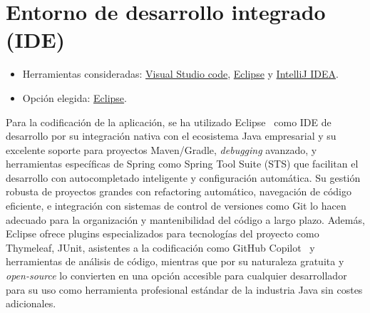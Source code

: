 \section{Entorno de desarrollo integrado (IDE)}\label{entorno-de-desarrollo-integrado}

\begin{itemize}
\tightlist
\item
  Herramientas consideradas: 
  \href{https://code.visualstudio.com/}{Visual Studio code}, 
  \href{https://eclipse.org/}{Eclipse} y
  \href{https://www.jetbrains.com/idea/}{IntelliJ IDEA}.
\item
  Opción elegida: \href{https://eclipse.org/}{Eclipse}.
\end{itemize}

Para la codificación de la aplicación, se ha utilizado Eclipse~\cite{eclipse} como IDE de desarrollo por su integración nativa con el ecosistema Java empresarial y su excelente soporte para proyectos Maven/Gradle, \emph{debugging} avanzado, y herramientas específicas de Spring como Spring Tool Suite (STS) que facilitan el desarrollo con autocompletado inteligente y configuración automática. Su gestión robusta de proyectos grandes con refactoring automático, navegación de código eficiente, e integración con sistemas de control de versiones como Git lo hacen adecuado para la organización y mantenibilidad del código a largo plazo. Además, Eclipse ofrece plugins especializados para tecnologías del proyecto como Thymeleaf, JUnit, asistentes a la codificación como GitHub Copilot~\cite{github-copilot} y herramientas de análisis de código, mientras que por su naturaleza gratuita y \emph{open-source} lo convierten en una opción accesible para cualquier desarrollador para su uso como herramienta profesional estándar de la industria Java sin costes adicionales.
